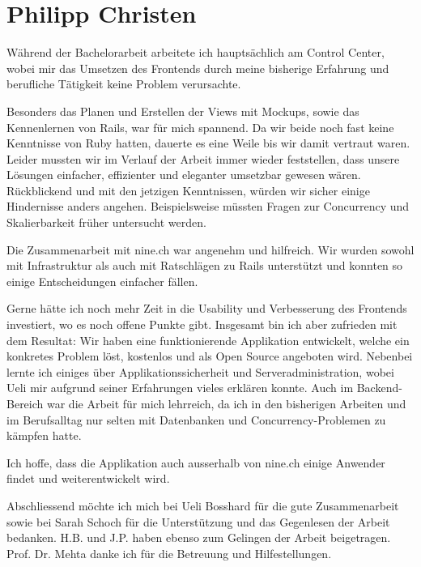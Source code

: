 \section*{Philipp Christen}

Während der Bachelorarbeit arbeitete ich hauptsächlich am Control Center, wobei mir das Umsetzen des Frontends durch meine bisherige Erfahrung und berufliche Tätigkeit keine Problem verursachte.

Besonders das Planen und Erstellen der Views mit Mockups, sowie das Kennenlernen von Rails, war für mich spannend. Da wir beide noch fast keine Kenntnisse von Ruby hatten, dauerte es eine Weile bis wir damit vertraut waren. Leider mussten wir im Verlauf der Arbeit immer wieder feststellen, dass unsere Lösungen einfacher, effizienter und eleganter umsetzbar gewesen wären. Rückblickend und mit den jetzigen Kenntnissen, würden wir sicher einige Hindernisse anders angehen. Beispielsweise müssten Fragen zur Concurrency und Skalierbarkeit früher untersucht werden.

Die Zusammenarbeit mit nine.ch war angenehm und hilfreich. Wir wurden sowohl mit Infrastruktur als auch mit Ratschlägen zu Rails unterstützt und konnten so einige Entscheidungen einfacher fällen.

Gerne hätte ich noch mehr Zeit in die Usability und Verbesserung des Frontends investiert, wo es noch offene Punkte gibt. Insgesamt bin ich aber zufrieden mit dem Resultat: Wir haben eine funktionierende Applikation entwickelt, welche ein konkretes Problem löst, kostenlos und als Open Source angeboten wird. Nebenbei lernte ich einiges über Applikationssicherheit und Serveradministration, wobei Ueli mir aufgrund seiner Erfahrungen vieles erklären konnte. Auch im Backend-Bereich war die Arbeit für mich lehrreich, da ich in den bisherigen Arbeiten und im Berufsalltag nur selten mit Datenbanken und Concurrency-Problemen zu kämpfen hatte.

Ich hoffe, dass die Applikation auch ausserhalb von nine.ch einige Anwender findet und weiterentwickelt wird.

Abschliessend möchte ich mich bei Ueli Bosshard für die gute Zusammenarbeit sowie bei Sarah Schoch für die Unterstützung und das Gegenlesen der Arbeit bedanken. H.B. und J.P. haben ebenso zum Gelingen der Arbeit beigetragen. Prof. Dr. Mehta danke ich für die Betreuung und Hilfestellungen.
